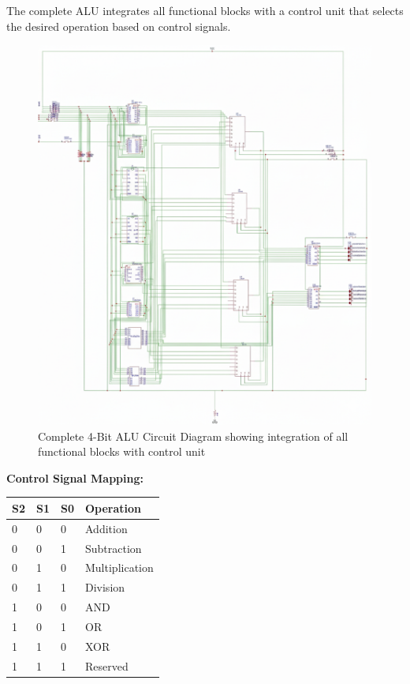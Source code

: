 The complete ALU integrates all functional blocks with a control unit that selects the desired operation based on control signals.

\begin{figure}[h]
    \centering
    \includegraphics[width=\textwidth]{complete-alu-diagram}
    \caption{Complete 4-Bit ALU Circuit Diagram showing integration of all functional blocks with control unit}
    \label{fig:complete-alu}
\end{figure}

\textbf{Control Signal Mapping:}
\begin{table}
\centering
\begin{tabular}{llll}
\toprule
\textbf{S2} & \textbf{S1} & \textbf{S0} & \textbf{Operation} \\
\midrule
0 & 0 & 0 & Addition \\
0 & 0 & 1 & Subtraction \\
0 & 1 & 0 & Multiplication \\
0 & 1 & 1 & Division \\
1 & 0 & 0 & AND \\
1 & 0 & 1 & OR \\
1 & 1 & 0 & XOR \\
1 & 1 & 1 & Reserved \\
\bottomrule
\end{tabular}
\label{tab:control-signals}
\end{table}
